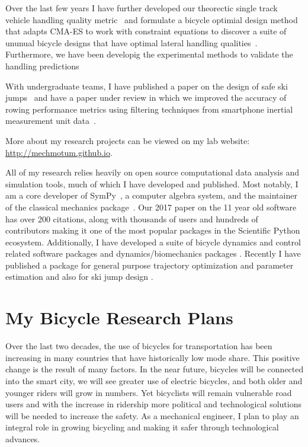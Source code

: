 \documentclass{article}
\begin{document}
Over the last few years I have further developed our theorectic single track
vehicle handling quality metric~\cite{Hess2012} and formulate a bicycle
optimial design method that adapts CMA-ES to work with constraint equations to
discover a suite of ununual bicycle designs that have optimal lateral handling
qualities~\cite{Moore2016,Moore2019a}. Furthermore, we have been developig the
experimental methods to validate the handling
predictions~\cite{Kresie2017,Gilboa2019a}

With undergraduate teams, I have published a paper on the design of safe ski
jumps~\cite{Moore2018} and have a paper under review in which we improved the
accuracy of rowing performance metrics using filtering techniques from
smartphone inertial measurement unit data~\cite{Cloud2019b}.

More about my research projects can be viewed on my lab website:
\url{http://mechmotum.github.io}.

All of my research relies heavily on open source computational data analysis
and simulation tools, much of which I have developed and published. Most
notably, I am a core developer of SymPy~\cite{SymPyDevelopmentTeam2006}, a
computer algebra system, and the maintainer of the classical mechanics
package~\cite{Gede2013}. Our 2017 paper \cite{Meurer2017} on the 11 year old
software has over 200 citations, along with thousands of users and hundreds of
contributors making it one of the most popular packages in the Scientific
Python ecosystem.  Additionally, I have developed a suite of bicycle dynamics
and control related software packages
\cite{Moore2010b,Moore2011d,Moore2011a,Moore2011e} and dynamics/biomechanics
packages \cite{Dembia2011,Moore2011,Moore2011b} \cite{Moore2013b}
\cite{Moore2017b} \cite{Moore2018a}. Recently I have published a package for
general purpose trajectory optimization and parameter estimation
\cite{Moore2018} and also for ski jump design \cite{Moore2018a}.

\section*{My Bicycle Research Plans}
%
Over the last two decades, the use of bicycles for transportation has been
increasing in many countries that have historically low mode share. This
positive change is the result of many factors. In the near future, bicycles
will be connected into the smart city, we will see greater use of electric
bicycles, and both older and younger riders will grow in numbers. Yet
bicyclists will remain vulnerable road users and with the increase in ridership
more  political and technological solutions will be needed to increase the
safety. As a mechanical engineer, I plan to play an integral role in growing
bicycling and making it safer through technological advances.
\end{document}
